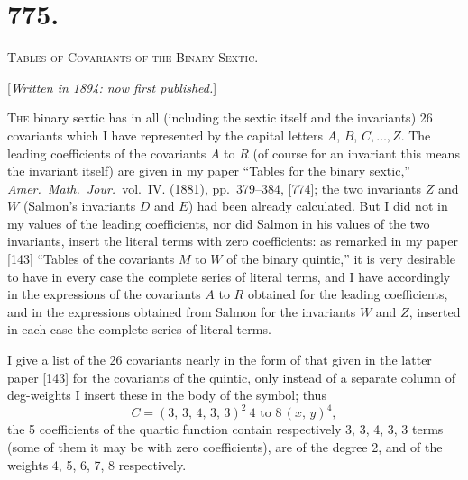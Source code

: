\documentclass[11pt,a4paper]{book}
\begin{document}
\section*{775.}

\begin{center}
\Large\scshape Tables of Covariants of the Binary Sextic.
\end{center}

\begin{center}
[\textit{Written in 1894: now first published.}]
\end{center}

\textsc{The} binary sextic has in all (including the sextic itself and the invariants) 26 covariants which I have represented by the capital letters $A$, $B$, $C,\dots, Z$. The leading coefficients of the covariants $A$ to $R$ (of course for an invariant this means the invariant itself) are given in my paper ``Tables for the binary sextic,'' \textit{Amer.\ Math.\ Jour.}\ vol.~IV. (1881), pp.~379--384, [774]; the two invariants $Z$ and $W$ (Salmon's invariants $D$ and $E$) had been already calculated. But I did not in my values of the leading coefficients, nor did Salmon in his values of the two invariants, insert the literal terms with zero coefficients: as remarked in my paper [143] ``Tables of the covariants $M$ to $W$ of the binary quintic,'' it is very desirable to have in every case the complete series of literal terms, and I have accordingly in the expressions of the covariants $A$ to $R$ obtained for the leading coefficients, and in the expressions obtained from Salmon for the invariants $W$ and $Z$, inserted in each case the complete series of literal terms.

I give a list of the 26 covariants nearly in the form of that given in the latter paper [143] for the covariants of the quintic, only instead of a separate column of deg-weights I insert these in the body of the symbol; thus
\[
C = (3,\, 3,\, 4,\, 3,\, 3)^{2}\ 4\text{ to }8\, (x,\, y)^{4},
\]
the 5 coefficients of the quartic function contain respectively 3, 3, 4, 3, 3 terms (some of them it may be with zero coefficients), are of the degree 2, and of the weights 4, 5, 6, 7, 8 respectively.
\end{document}
